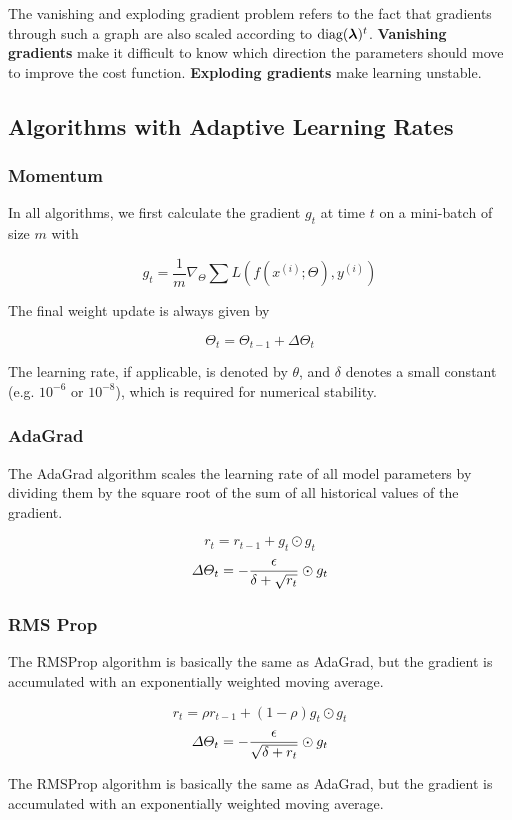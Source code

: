 \begin{multicols}{2}
	The vanishing and exploding gradient problem refers to the fact that gradients through such a graph are also scaled according to $\diag(\bol{\lambda})^t$.
	\textbf{Vanishing gradients }make it difficult to know which direction the parameters should move to improve the cost function. 
	\textbf{Exploding gradients} make learning unstable.
	
	\subsection{Algorithms with Adaptive Learning Rates }
		\subsubsection{Momentum}
		In all algorithms, we first calculate the gradient $g_t$ at time $t$ on a mini-batch of size $m$ with
		
		\[ g_{t} = \frac{1}{m} \nabla_{\Theta} \sum L(f(x^{(i)};\Theta),y^{(i)})    \]
		
		The final weight update is always given by
		
		\[ \Theta_{t} = \Theta_{t-1} + \Delta\Theta_{t} \]
		
		The learning rate, if applicable, is denoted by $\theta$, and $\delta$ denotes a small constant (e.g. $ 10^{-6} $ or $ 10^{-8} $), which is required for numerical stability.
		
		\subsubsection{AdaGrad}
		The AdaGrad algorithm scales the learning rate of all model parameters by dividing them by the square root of the sum of all historical values of the gradient.
		
		\[ r_{t} = r_{t-1} + g_{t}\odot g_{t} \]
		\[ \Delta\Theta_{t} = - \frac{{\epsilon}}{\delta + \sqrt{r_{t}}} \odot g_{t} \]
	
		\subsubsection{RMS Prop}
		The RMSProp algorithm is basically the same as AdaGrad, but the gradient is accumulated with an exponentially weighted moving average.
		
		\[ r_{t} = \rho r_{t-1} + (1- \rho) g_{t}\odot g_{t}\]
		\[ \Delta\Theta_{t} = - \frac{{\epsilon}}{\sqrt{\delta + r_{t}}} \odot g_{t} \]
		
		The RMSProp algorithm is basically the same as AdaGrad, but the gradient is accumulated with an exponentially weighted moving average.
		

\end{multicols}
